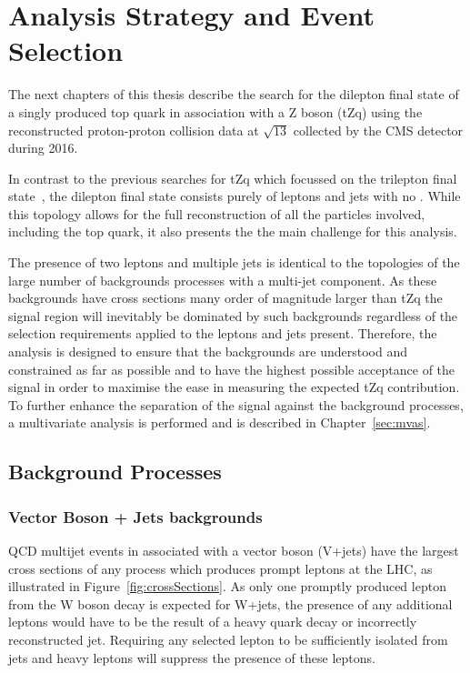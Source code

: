 \chapter{Analysis Strategy and Event Selection}\label{chapter:tzq-search}
The next chapters of this thesis describe the search for the dilepton final state of a singly produced top quark in association with a Z boson (tZq) using the reconstructed proton-proton collision data at $\sqrt{13}$ collected by the CMS detector during 2016.

In contrast to the previous searches for tZq which focussed on the trilepton final state~\cite{Sirunyan:2017kkr,Sirunyan:2017nbr}, the dilepton final state consists purely of leptons and jets with no \MET.
While this topology allows for the full reconstruction of all the particles involved, including the top quark, it also presents the the main challenge for this analysis.

The presence of two leptons and multiple jets is identical to the topologies of the large number of backgrounds processes with a multi-jet component.
As these backgrounds have cross sections many order of magnitude larger than tZq the signal region will inevitably be dominated by such backgrounds regardless of the selection requirements applied to the leptons and jets present.
Therefore, the analysis is designed to ensure that the backgrounds are understood and constrained as far as possible and to have the highest possible acceptance of the signal in order to maximise the ease in measuring the expected tZq contribution.
To further enhance the separation of the signal against the background processes, a multivariate analysis is performed and is described in Chapter~\ref{sec:mvas}.

\section{Background Processes}\label{sec:backgroundProcesses}
\subsection{Vector Boson + Jets backgrounds}
QCD multijet events in associated with a vector boson (V+jets) have the largest cross sections of any process which produces prompt leptons at the LHC, as illustrated in Figure~\ref{fig:crossSections}.
As only one promptly produced lepton from the W boson decay is expected for W+jets, the presence of any additional leptons would have to be the result of a heavy quark decay or incorrectly reconstructed jet. 
Requiring any selected lepton to be sufficiently isolated from jets and heavy leptons will suppress the presence of these leptons.

